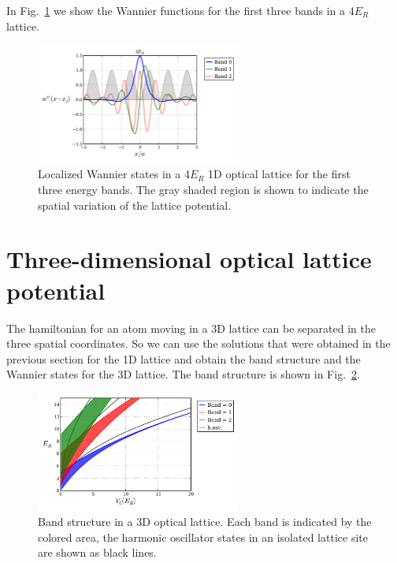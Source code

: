 \documentclass[11pt,letter]{article}
\begin{document}
In Fig.~\ref{fig:wannier1d_bands} we show the Wannier functions for the first
three bands in a 4$E_{R}$ lattice.  
\begin{figure}
\centering \includegraphics[width=0.6\textwidth]{../BandStructure_figures/wannier1d_bands.pdf}
\caption[Wannier states in 1D lattice for the first three energy bands.]{\small
Localized Wannier states in a 4$E_{R}$ 1D optical lattice for the first three
energy bands.
The gray shaded region is shown to  indicate the spatial variation of the
lattice potential.
} \label{fig:wannier1d_bands}
\end{figure}

\section{Three-dimensional optical lattice potential}

The hamiltonian for an atom moving in a  3D lattice can be separated in the
three spatial coordinates.  So we can use the solutions that were obtained in
the previous section for the 1D lattice and obtain the band structure and the
Wannier states for the 3D lattice.   
The band structure is shown in Fig.~\ref{fig:bands3d_V0}. 
\begin{figure}
\centering \includegraphics[width=0.6\textwidth]{../BandStructure_figures/bands3d_V0.pdf}
\caption[Band structure in 3D lattice.]{\small Band structure in a 3D optical
lattice.  Each band is indicated by the colored area,  the harmonic oscillator
states in an isolated lattice site are shown as black lines. }
\label{fig:bands3d_V0}
\end{figure}
\end{document}
